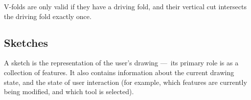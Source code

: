V-folds are only valid if they have a driving fold, and their vertical
cut intersects the driving fold exactly once.

\subsection{Sketches}\label{sketches}

A sketch is the representation of the user's drawing ---~its primary
role is as a collection of features. It also contains information about
the current drawing state, and the state of user interaction (for
example, which features are currently being modified, and which tool is
selected).
